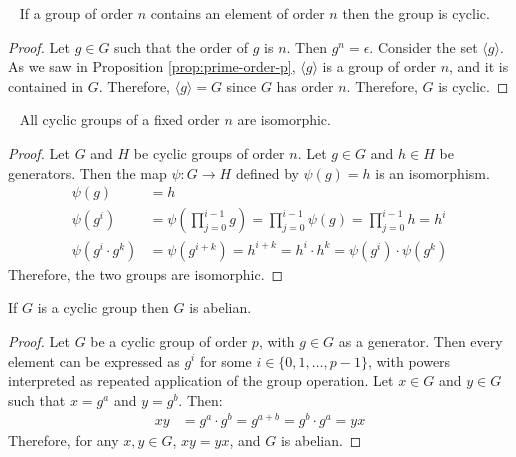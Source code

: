 \begin{proposition}~\label{prop:n-has-n-cyclic}
  If a group of order $n$ contains an element of order $n$
  then the group is cyclic.

  \begin{proof}
    Let $g \in G$ such that the order of $g$ is $n$.
    Then $g^n = \epsilon$.
    Consider the set $\langle g \rangle$.
    As we saw in Proposition \ref{prop:prime-order-p}, $\langle g \rangle$ is a group
    of order $n$, and it is contained in $G$.
    Therefore, $\langle g \rangle = G$ since $G$ has order $n$.
    Therefore, $G$ is cyclic.
  \end{proof}
\end{proposition}

\begin{proposition}~\label{prop:cyclic-same-order-isomorphic}
  All cyclic groups of a fixed order $n$ are isomorphic.

  \begin{proof}
    Let $G$ and $H$ be cyclic groups of order $n$.
    Let $g \in G$ and $h \in H$ be generators.
    Then the map $\psi: G \to H$ defined by $\psi(g) = h$ is an isomorphism.
    \begin{align*}
      \psi(g) &= h \\
      \psi(g^i) &= \psi \left( \prod_{j=0}^{i-1} g \right)
                 = \prod_{j=0}^{i-1} \psi(g)
                 = \prod_{j=0}^{i-1} h
                 = h^i \\
      \psi(g^i \cdot g^k) &= \psi(g^{i+k})
                           = h^{i+k} = h^i \cdot h^k = \psi(g^i) \cdot \psi(g^k)
    \end{align*}
    Therefore, the two groups are isomorphic.
  \end{proof}
\end{proposition}


\begin{proposition}
  If $G$ is a cyclic group then $G$ is abelian.~\label{prop:cyclic-then-abelian}

  \begin{proof}
    Let $G$ be a cyclic group of order $p$, with $g \in G$ as a generator.
    Then every element can be expressed as $g^i$ for some $i \in \{0,1,\ldots,p-1\}$,
    with powers interpreted as repeated application of the group operation.
    Let $x \in G$ and $y \in G$ such that $x = g^a$ and $y = g^b$. Then:
    \begin{align}
      xy &= g^a \cdot g^b = g^{a+b}  = g^b \cdot g^a = yx
    \end{align}
    Therefore, for any $x,y \in G$, $xy = yx$, and $G$ is abelian.
  \end{proof}
\end{proposition}

